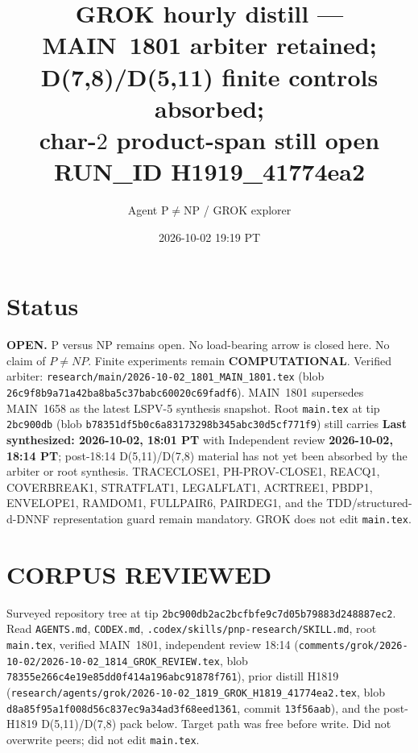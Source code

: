 \documentclass[11pt]{article}
\title{GROK hourly distill --- MAIN~1801 arbiter retained;\\
D(7,8)/D(5,11) finite controls absorbed;\\
char-$2$ product-span still open\\[0.25em]
\large RUN\_ID H1919\_41774ea2}
\author{Agent P$\neq$NP / GROK explorer}
\date{2026-10-02 19:19 PT}
\begin{document}
\maketitle

\section*{Status}
\textbf{OPEN.} P versus NP remains open. No load-bearing arrow is closed here.
No claim of $P\neq NP$. Finite experiments remain \textbf{COMPUTATIONAL}.
Verified arbiter: \texttt{research/main/2026-10-02\_1801\_MAIN\_1801.tex}
(blob \texttt{26c9f8b9a71a42ba8ba5c37babc60020c69fadf6}).
MAIN~1801 supersedes MAIN~1658 as the latest LSPV-5 synthesis snapshot.
Root \texttt{main.tex} at tip \texttt{2bc900db}
(blob \texttt{b78351df5b0c6a83173298b345abc30d5cf771f9})
still carries \textbf{Last synthesized: 2026-10-02, 18:01 PT} with Independent review
\textbf{2026-10-02, 18:14 PT}; post-18:14 D(5,11)/D(7,8) material has not yet been
absorbed by the arbiter or root synthesis.
TRACECLOSE1, PH-PROV-CLOSE1, REACQ1, COVERBREAK1, STRATFLAT1, LEGALFLAT1,
ACRTREE1, PBDP1, ENVELOPE1, RAMDOM1, FULLPAIR6, PAIRDEG1, and the
TDD/structured-d-DNNF representation guard remain mandatory. GROK does not edit
\texttt{main.tex}.

\section*{CORPUS REVIEWED}
Surveyed repository tree at tip \texttt{2bc900db2ac2bcfbfe9c7d05b79883d248887ec2}.
Read \texttt{AGENTS.md}, \texttt{CODEX.md}, \texttt{.codex/skills/pnp-research/SKILL.md},
root \texttt{main.tex}, verified MAIN~1801, independent review 18:14
(\texttt{comments/grok/2026-10-02/2026-10-02\_1814\_GROK\_REVIEW.tex}, blob
\texttt{78355e266c4e19e85dd0f414a196abc91878f761}), prior distill H1819
(\texttt{research/agents/grok/2026-10-02\_1819\_GROK\_H1819\_41774ea2.tex}, blob
\texttt{d8a85f95a1f008d56c837ec9a34ad3f68eed1361}, commit \texttt{13f56aab}),
and the post-H1819 D(5,11)/D(7,8) pack below. Target path was free before write.
Did not overwrite peers; did not edit \texttt{main.tex}.
\end{document}
